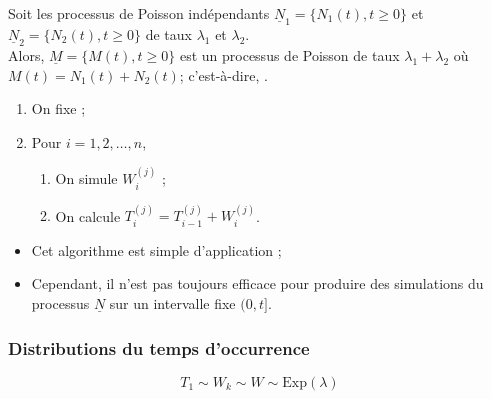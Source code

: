 \documentclass[10pt, french]{article}
\begin{document}
\begin{multicols*}{2}
\begin{definitionNOHFILLpropos}
Soit les processus de Poisson indépendants $\underline{N}_{1}	=	\{N_{1}(t), t \geq 0\}$ et $\underline{N}_{2}	=	\{N_{2}(t), t \geq 0\}$ de taux $\lambda_{1}$ et $\lambda_{2}$.\\

Alors, $\underline{M}	=	\{M(t), t \geq 0\}$ est un processus de Poisson de taux $\lambda_{1} + \lambda_{2}$ où $M(t)	=	N_{1}(t) + N_{2}(t)$; c'est-à-dire, .
\end{definitionNOHFILLpropos}

\begin{algo2}
\begin{enumerate}
	\item	On fixe  ;
	\item	Pour $i	=	1, 2, \dots, n$, 
		\begin{enumerate}[label = \alph*)]
		\item	On simule $W_{i}^{(j)}$ ;
		\item	On calcule $T_{i}^{(j)}	=	T_{i - 1}^{(j)} + W_{i}^{(j)}$.
		\end{enumerate}
\end{enumerate}

\tcbline

\begin{itemize}
	\item	Cet algorithme est simple d'application ;
	\item	Cependant, il n'est pas toujours efficace pour produire des simulations du processus $\underline{N}$ sur un intervalle fixe $(0, t]$.
\end{itemize}
\end{algo2}

\subsubsection*{Distributions du temps d'occurrence}
\begin{rappel_enhanced}
\begin{equation*}
	T_{1}	\sim	W_{k}	\sim	W	\sim	\text{Exp}(\lambda)
\end{equation*}
\end{rappel_enhanced}


\end{multicols*}
\end{document}
